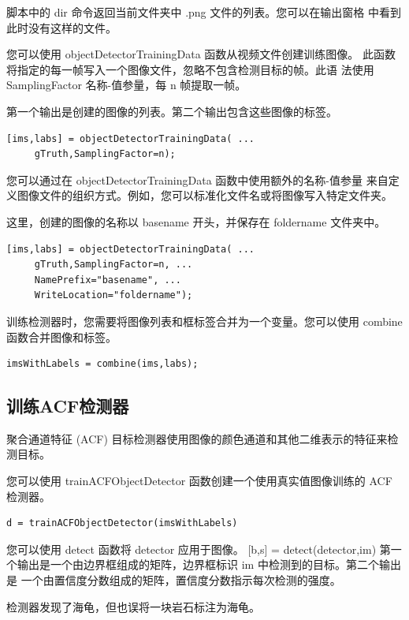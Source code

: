 \documentclass[12pt,a4paper]{article}
\begin{document}
脚本中的 dir 命令返回当前文件夹中 .png 文件的列表。您可以在输出窗格
中看到此时没有这样的文件。

您可以使用 objectDetectorTrainingData 函数从视频文件创建训练图像。
此函数将指定的每一帧写入一个图像文件，忽略不包含检测目标的帧。此语
法使用 SamplingFactor 名称-值参量，每 n 帧提取一帧。

第一个输出是创建的图像的列表。第二个输出包含这些图像的标签。

\begin{lstlisting}
[ims,labs] = objectDetectorTrainingData( ...
     gTruth,SamplingFactor=n);
\end{lstlisting}


您可以通过在 objectDetectorTrainingData 函数中使用额外的名称-值参量
来自定义图像文件的组织方式。例如，您可以标准化文件名或将图像写入特定文件夹。

这里，创建的图像的名称以 basename 开头，并保存在 foldername 文件夹中。

\begin{lstlisting}
[ims,labs] = objectDetectorTrainingData( ...
     gTruth,SamplingFactor=n, ...
     NamePrefix="basename", ...
     WriteLocation="foldername");
\end{lstlisting}

训练检测器时，您需要将图像列表和框标签合并为一个变量。您可以使用 combine 
函数合并图像和标签。

\begin{lstlisting}
imsWithLabels = combine(ims,labs);
\end{lstlisting}

\subsection{训练ACF检测器}

聚合通道特征 (ACF) 目标检测器使用图像的颜色通道和其他二维表示的特征来检测目标。

您可以使用 trainACFObjectDetector 函数创建一个使用真实值图像训练的 ACF 检测器。

\begin{lstlisting}
d = trainACFObjectDetector(imsWithLabels)
\end{lstlisting}

您可以使用 detect 函数将 detector 应用于图像。
[b,s] = detect(detector,im)
第一个输出是一个由边界框组成的矩阵，边界框标识 im 中检测到的目标。第二个输出是
一个由置信度分数组成的矩阵，置信度分数指示每次检测的强度。

检测器发现了海龟，但也误将一块岩石标注为海龟。
\end{document}
